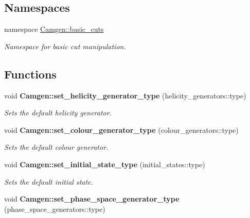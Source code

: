 \subsection*{Namespaces}
\begin{DoxyCompactItemize}
\item 
namespace \hyperlink{a00850}{Camgen\-::basic\-\_\-cuts}
\begin{DoxyCompactList}\small\item\em Namespace for basic cut manipulation. \end{DoxyCompactList}\end{DoxyCompactItemize}
\subsection*{Functions}
\begin{DoxyCompactItemize}
\item 
\hypertarget{a00849_ae0737b857faf74c1f584b8270b7d6caa}{void {\bfseries Camgen\-::set\-\_\-helicity\-\_\-generator\-\_\-type} (helicity\-\_\-generators\-::type)}\label{a00849_ae0737b857faf74c1f584b8270b7d6caa}

\begin{DoxyCompactList}\small\item\em Sets the default helicity generator. \end{DoxyCompactList}\item 
\hypertarget{a00849_a14d183e26f400cb7b704a22e5bd3e78e}{void {\bfseries Camgen\-::set\-\_\-colour\-\_\-generator\-\_\-type} (colour\-\_\-generators\-::type)}\label{a00849_a14d183e26f400cb7b704a22e5bd3e78e}

\begin{DoxyCompactList}\small\item\em Sets the default colour generator. \end{DoxyCompactList}\item 
\hypertarget{a00849_ae1e034c0571edf9f7449ac4dd38b269b}{void {\bfseries Camgen\-::set\-\_\-initial\-\_\-state\-\_\-type} (initial\-\_\-states\-::type)}\label{a00849_ae1e034c0571edf9f7449ac4dd38b269b}

\begin{DoxyCompactList}\small\item\em Sets the default initial state. \end{DoxyCompactList}\item 
\hypertarget{a00849_a57c652dae85dfcc87140fee575dda9ce}{void {\bfseries Camgen\-::set\-\_\-phase\-\_\-space\-\_\-generator\-\_\-type} (phase\-\_\-space\-\_\-generators\-::type)}\label{a00849_a57c652dae85dfcc87140fee575dda9ce}


\end{DoxyCompactItemize}
